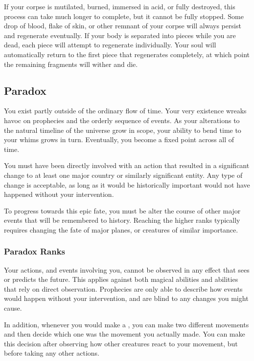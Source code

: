       If your corpse is mutilated, burned, immersed in acid, or fully destroyed, this process can take much longer to complete, but it cannot be fully stopped.
      Some drop of blood, flake of skin, or other remnant of your corpse will always persist and regenerate eventually.
      If your body is separated into pieces while you are dead, each piece will attempt to regenerate individually.
      Your soul will automatically return to the first piece that regenerates completely, at which point the remaining fragments will wither and die.

  \subsection{Paradox}
    You exist partly outside of the ordinary flow of time.
    Your very existence wreaks havoc on prophecies and the orderly sequence of events.
    As your alterations to the natural timeline of the universe grow in scope, your ability to bend time to your whims grows in turn.
    Eventually, you become a fixed point across all of time.

     You must have been directly involved with an action that resulted in a significant change to at least one major country or similarly significant entity.
    Any type of change is acceptable, as long as it would be historically important would not have happened without your intervention.

     To progress towards this epic fate, you must be alter the course of other major events that will be remembered to history.
    Reaching the higher ranks typically requires changing the fate of major planes, or creatures of similar importance.

    \subsubsection{Paradox Ranks}
       Your actions, and events involving you, cannot be observed in any effect that sees or predicts the future.
      This applies against both magical abilities and abilities that rely on direct observation.
      Prophecies are only able to describe how events would happen without your intervention, and are blind to any changes you might cause.

      In addition, whenever you would make a , you can make two different movements and then decide which one was the movement you actually made.
      You can make this decision after observing how other creatures react to your movement, but before taking any other actions.

